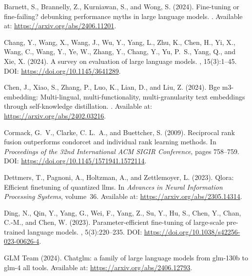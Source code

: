 \documentclass{article}
\begin{document}

\begin{thebibliography}{}

Barnett, S., Brannelly, Z., Kurniawan, S., and Wong, S. (2024).
\newblock Fine-tuning or fine-failing? debunking performance myths in large
  language models.
.
\newblock Available at: \url{https://arxiv.org/abs/2406.11201}.

Chang, Y., Wang, X., Wang, J., Wu, Y., Yang, L., Zhu, K., Chen, H., Yi, X.,
  Wang, C., Wang, Y., Ye, W., Zhang, Y., Chang, Y., Yu, P.~S., Yang, Q., and
  Xie, X. (2024).
\newblock A survey on evaluation of large language models.
,
  15(3):1--45.
\newblock DOI: \url{https://doi.org/10.1145/3641289}.

Chen, J., Xiao, S., Zhang, P., Luo, K., Lian, D., and Liu, Z. (2024).
\newblock Bge m3-embedding: Multi-lingual, multi-functionality,
  multi-granularity text embeddings through self-knowledge distillation.
.
\newblock Available at: \url{https://arxiv.org/abs/2402.03216}.

Cormack, G.~V., Clarke, C. L.~A., and Buettcher, S. (2009).
\newblock Reciprocal rank fusion outperforms condorcet and individual rank
  learning methods.
\newblock In {\em Proceedings of the 32nd International ACM SIGIR Conference},
  pages 758--759.
\newblock DOI: \url{https://doi.org/10.1145/1571941.1572114}.

Dettmers, T., Pagnoni, A., Holtzman, A., and Zettlemoyer, L. (2023).
\newblock Qlora: Efficient finetuning of quantized llms.
\newblock In {\em Advances in Neural Information Processing Systems},
  volume~36.
\newblock Available at: \url{https://arxiv.org/abs/2305.14314}.

Ding, N., Qin, Y., Yang, G., Wei, F., Yang, Z., Su, Y., Hu, S., Chen, Y., Chan,
  C.-M., and Chen, W. (2023).
\newblock Parameter-efficient fine-tuning of large-scale pre-trained language
  models.
, 5(3):220--235.
\newblock DOI: \url{https://doi.org/10.1038/s42256-023-00626-4}.

{GLM Team} (2024).
\newblock Chatglm: a family of large language models from glm-130b to glm-4 all
  tools.
\newblock Available at: \url{https://arxiv.org/abs/2406.12793}.


\end{thebibliography}
\end{document}
